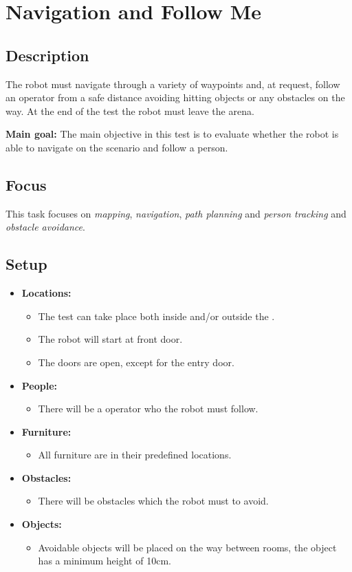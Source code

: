 \section{Navigation and Follow Me}
\label{test:navigation-and-follow-me}

\subsection*{Description}
The robot must navigate through a variety of waypoints and, at request, follow an operator from a safe distance avoiding hitting objects or any obstacles on the way. At the end of the test the robot must leave the arena.

\noindent \textbf{Main goal:}
The main objective in this test is to evaluate whether the robot is able to navigate on the scenario and follow a person.



\subsection*{Focus}
This task focuses on \textit{mapping}, \textit{navigation}, \textit{path planning} and \textit{person tracking} and \textit{obstacle avoidance}.

\subsection*{Setup}
\begin{itemize}[nosep]	
	\item \textbf{Locations:} 
	\begin{itemize}
		\item The test can take place both inside and/or outside the \Arena{}.
		\item The robot will start at front door.
		\item The doors are open, except for the entry door.
	\end{itemize}	 
	\item \textbf{People:} 
	\begin{itemize}
		\item There will be a operator who the robot must follow.
	\end{itemize}
	\item \textbf{Furniture:} 
	\begin{itemize}
		\item All furniture are in their predefined locations.
	\end{itemize}
	\item \textbf{Obstacles:} 
	\begin{itemize}
		\item There will be obstacles which the robot must to avoid.
	\end{itemize}
    \item \textbf{Objects:} 
    \begin{itemize}
		\item Avoidable objects will be placed on the way between rooms, the object has a minimum height of 10cm.
	\end{itemize}
\end{itemize}

